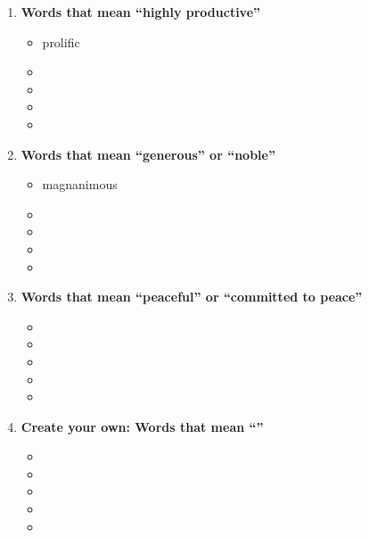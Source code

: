 \begin{enumerate}
\begin{itemize}
\end{itemize}

\item \textbf{Words that mean ``highly productive''}

\begin{itemize}
\item prolific
\item    
\item   
\item   
\item  

\end{itemize}

\item \textbf{Words that mean ``generous'' or ``noble''}

\begin{itemize}
\item    magnanimous
\item    
\item   
\item   
\item  

\end{itemize}

\item \textbf{Words that mean ``peaceful'' or ``committed to peace''}

\begin{itemize}
\item     
\item    
\item   
\item   
\item  

\end{itemize}

\item \textbf{Create your own: Words that mean ``\underline{\hspace{2in}}''}

\begin{itemize}
\item     
\item    
\item   
\item   
\item  
\end{itemize}
\end{enumerate}